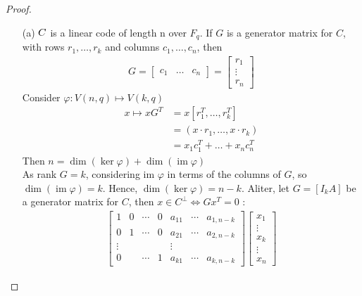 \begin{proof}
    \begin{itemize}
        \item[(a)] $C\*$ is a linear code of length n over $F_{q}$. If $G$ is a generator matrix for $C$, with rows $r_1, \ldots, r_k$ and columns $c_1, \ldots, c_n$, then
            \begin{gather*}
                G = 
                \begin{bmatrix}
                    c_1 & \ldots & c_n
                \end{bmatrix}
                =
                \begin{bmatrix}
                    r_1 \\ \vdots \\ r_n
                \end{bmatrix}
            \end{gather*}
            Consider $\varphi: V(n,q) \mapsto V(k,q)$
            \begin{align*}
                x \mapsto x G^{T}
                & = x[r_1^{T}, \ldots, r_k^{T}]\\
                & = (x \cdot r_1, \ldots, x \cdot r_k)\\
                & = x_1 c_1^{T} + \ldots + x_n c_n^{T}
            \end{align*}
            Then $n = \dim(\operatorname{ker} \varphi) + \dim(\operatorname{im} \varphi)$\\
            As rank $G=k$, considering im $\varphi$ in terms of the columns of $G$, so $\operatorname{dim}(\operatorname{im} \varphi)=k$. Hence, $\operatorname{dim}(\operatorname{ker} \varphi)=n-k$.
            Aliter, let $G=\left[I_k A\right]$ be a generator matrix for $C$, then $x \in C^{\perp} \Leftrightarrow G x^T=0$ :
            \begin{gather*}
            \begin{bmatrix}
                1 & 0 & \cdots & 0 & a_{11} & \cdots & a_{1, n-k} \\
                0 & 1 & \cdots & 0 & a_{21} & \cdots & a_{2, n-k} \\
                \vdots & & & & \vdots & & \\
                0 & & \cdots & 1 & a_{k 1} & \cdots & a_{k, n-k}
            \end{bmatrix}
            \begin{bmatrix}
                x_1 \\ \vdots \\ x_k \\ \vdots \\ x_n

\end{bmatrix}
\end{gather*}
\end{itemize}
\end{proof}
